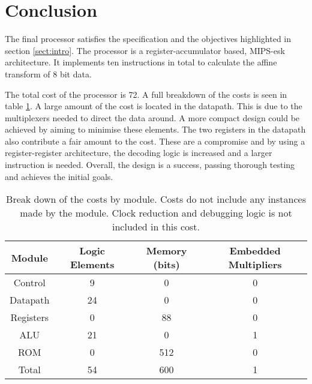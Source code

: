 

\section{Conclusion}

The final processor satisfies the specification and the objectives highlighted in section \ref{sect:intro}.
The processor is a register-accumulator based, MIPS-esk  architecture. 
It implements ten instructions in total to calculate the affine transform of 8 bit data.

The total cost of the processor is 72.
A full breakdown of the costs is seen in table \ref{tab:costs}.
A large amount of the cost is located in the datapath. 
This is due to the multiplexers needed to direct the data around. 
A more compact design could be achieved by aiming to minimise these elements. 
The two registers in the datapath also contribute a fair amount to the cost. 
These are a compromise and by using a register-register architecture, the decoding logic is increased and a larger instruction is needed.
Overall, the design is a success, passing thorough testing and achieves the initial goals. 


\begin{table}
\caption{Break down of the costs by module. Costs do not include any instances made by the module. Clock reduction and debugging logic is not included in this cost.}
\label{tab:costs}
\begin{tabular}{cccc} \toprule
Module		& Logic Elements	& Memory (bits)	& Embedded Multipliers \\ \midrule
Control		& 9			& 0		& 0	\\
Datapath	& 24			& 0		& 0	\\
Registers	& 0			& 88		& 0	\\
ALU		& 21			& 0		& 1	\\
ROM		& 0			& 512		& 0 	\\ \midrule
Total 		& 54			& 600		& 1 	\\ \bottomrule
\end{tabular}
\end{table}


